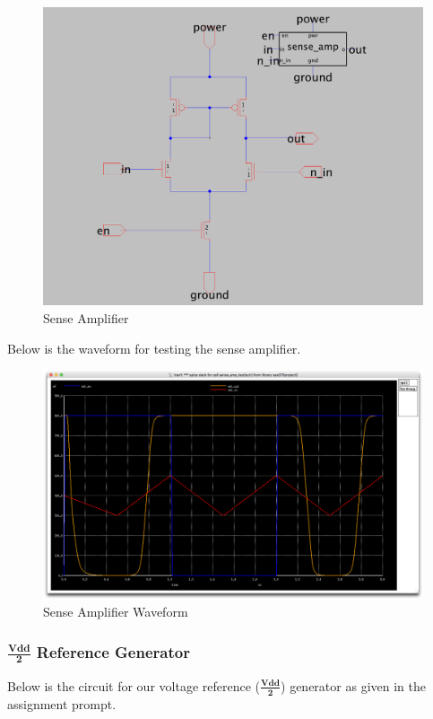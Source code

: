 \documentclass[a4paper]{article}
\begin{document}
\begin{figure}[H]
	\centering
	\includegraphics[scale=0.17]{senseAmp}
	\caption{Sense Amplifier}
	\label{fig:senseAmp}
\end{figure}

Below is the waveform for testing the sense amplifier.

\begin{figure}[H]
	\centering
	\includegraphics[scale=0.12]{senseAmpWave}
	\caption{Sense Amplifier Waveform}
	\label{fig:senseAmpWave}
\end{figure}

\subsubsection{$\frac{\textbf{Vdd}}{\textbf{2}}$ Reference Generator}
Below is the circuit for our voltage reference ($\frac{\textbf{Vdd}}{\textbf{2}}$) generator as given in the assignment prompt.
\end{document}
